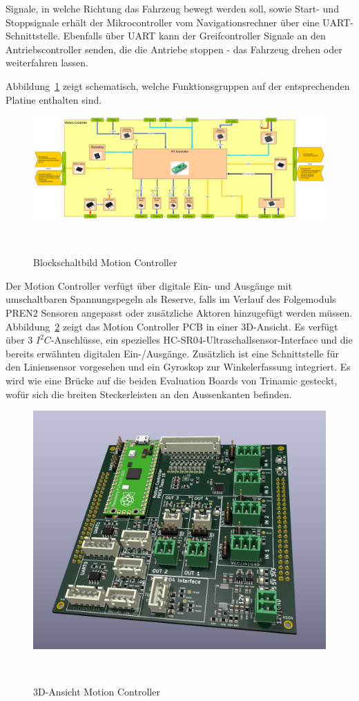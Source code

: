 \documentclass[main.tex]{subfiles} %
\begin{document}
Signale, in welche Richtung das Fahrzeug bewegt werden soll, sowie Start- und
Stoppsignale erhält der Mikrocontroller vom Navigationsrechner über eine
UART-Schnittstelle. Ebenfalls über UART kann der Greifcontroller Signale an den
Antriebscontroller senden, die die Antriebe stoppen - das Fahrzeug drehen oder
weiterfahren lassen.

Abbildung~\ref{fig:Blockschaltbild_Motioncontroller} zeigt schematisch, welche
Funktionsgruppen auf der entsprechenden Platine enthalten sind.

\begin{figure}[H]
    \centering
    \includegraphics[width = 1\linewidth]{fig_Antriebe_und_Dimensionierung/MotionController_Blockschaltbild.pdf}
    \caption{Blockschaltbild Motion Controller}~\label{fig:Blockschaltbild_Motioncontroller}
\end{figure}

Der Motion Controller verfügt über digitale Ein- und Ausgänge mit umschaltbaren
Spannungspegeln als Reserve, falls im Verlauf des Folgemoduls PREN2 Sensoren
angepasst oder zusätzliche Aktoren hinzugefügt werden
müssen. Abbildung~\ref{fig:MotionBoard_PCB} zeigt das Motion Controller PCB in
einer 3D-Ansicht. Es verfügt über 3 $I^2C$-Anschlüsse, ein spezielles
HC-SR04-Ultraschallsensor-Interface und die bereits erwähnten digitalen
Ein-/Ausgänge. Zusätzlich ist eine Schnittstelle für den Liniensensor
vorgesehen und ein Gyroskop zur Winkelerfassung integriert. Es wird wie eine
Brücke auf die beiden Evaluation Boards von Trinamic gesteckt, wofür sich die
breiten Steckerleisten an den Aussenkanten befinden.

\begin{figure}[H]
    \centering
    \includegraphics[width = 0.75\linewidth]{fig_Antriebe_und_Dimensionierung/MotionControllerPCB.jpg}
    \caption{3D-Ansicht Motion Controller}~\label{fig:MotionBoard_PCB}
\end{figure}
\end{document}
